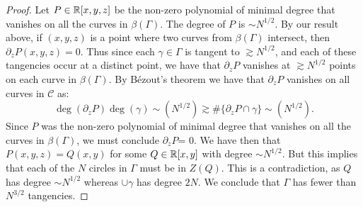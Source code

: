 \begin{proof}
    Let $P \in \mathbb R[x,y,z]$ be the non-zero polynomial of minimal degree that vanishes on all the curves in $\beta (\Gamma)$. The degree of $P$ is $\sim N^{1/2}$. 
    By our result above, if $(x,y,z)$ is a point where two curves from $\beta (\Gamma)$ intersect, then $\partial_z P (x,y,z)  =0 $. Thus since each $\gamma \in \Gamma$ is 
    tangent to $\gtrsim N^{1/2}$, and each of these tangencies occur at a distinct point, we have that $\partial_z P$ vanishes at $\gtrsim N^{1/2}$ points on each curve in $\beta (\Gamma)$.
   By Bézout's theorem we have that $\partial_z P$ vanishes on all curves in $\mathscr{C}$ as:
    \[
    \deg (\partial_z P) \deg (\gamma) \sim  (N^{1/2}) \gtrsim \# \{\partial_z P \cap \gamma\} \sim (N^{1/2}) .    
    \] Since $P$ was the non-zero polynomial of minimal degree that vanishes on all the curves in $\beta (\Gamma)$, we must conclude 
    $\partial_z P$= 0. We have then that $P(x,y,z) = Q(x,y)$ for some $Q \in \mathbb R[x,y]$ with degree $\sim N^{1/2}$. 
    But this implies that each of the $N$ circles in $\Gamma$ must be in $Z(Q)$. This is a contradiction, as $Q$ has degree $\sim N^{1/2}$ whereas $\cup \gamma$ has degree $2N$.
    We conclude that $\Gamma$ has fewer than $N^{3/2}$ tangencies.
\end{proof}


